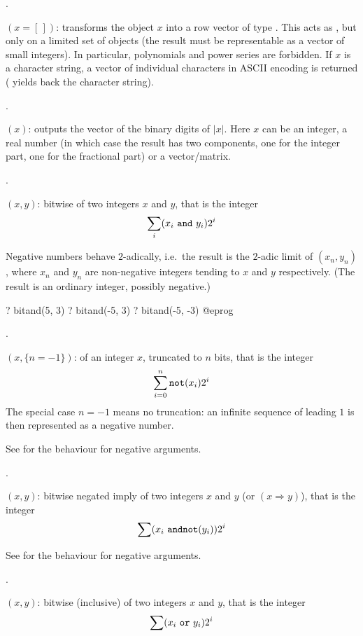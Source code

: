 .

$({x=[\,]})$: transforms the object $x$ into a row
vector of type . This acts as , but only on a
limited set of objects (the result must be representable as a vector of small
integers). In particular, polynomials and power series are forbidden.
If $x$ is a character string, a vector of individual characters in ASCII
encoding is returned ( yields back the character string).

.

$(x)$: outputs the vector of the binary digits of $|x|$.
Here $x$ can be an integer, a real number (in which case the result has two
components, one for the integer part, one for the fractional part) or a
vector/matrix.

.

$(x,y)$:\label{se:bitand} bitwise  of two integers $x$ and $y$, that is the integer
$$\sum_i (x_i~{\tt and}~y_i) 2^i$$

Negative numbers behave $2$-adically, i.e.~the result is the $2$-adic limit
of $(x_n,y_n)$, where $x_n$ and $y_n$ are non-negative integers
tending to $x$ and $y$ respectively. (The result is an ordinary integer,
possibly negative.)

\bprog
? bitand(5, 3)
? bitand(-5, 3)
? bitand(-5, -3)
@eprog

.

$(x,\{n=-1\})$:  of an integer $x$,
truncated to $n$ bits, that is the integer $$\sum_{i=0}^n {\tt not}(x_i)
2^i$$ The special case $n=-1$ means no truncation: an infinite sequence of
leading $1$ is then represented as a negative number.

See  for the behaviour for negative arguments.

.

$(x,y)$: bitwise negated imply of two integers $x$ and
$y$ (or  $(x \Rightarrow y)$), that is the integer $$\sum
(x_i~{\tt and not}(y_i)) 2^i$$

See  for the behaviour for negative arguments.

.

$(x,y)$: bitwise (inclusive)
 of two integers $x$ and $y$, that is the integer $$\sum
(x_i~{\tt or}~y_i) 2^i$$

